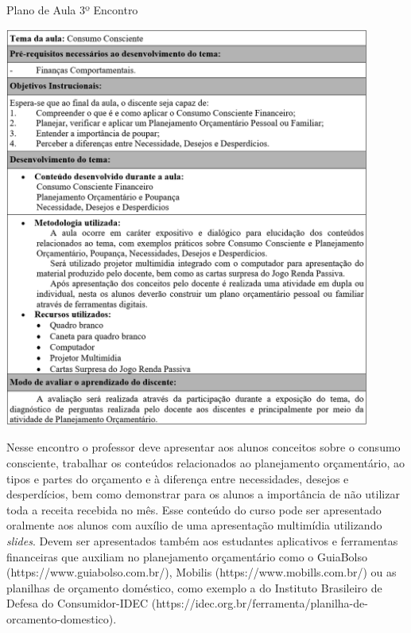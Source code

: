\graphicspath{{quadros/}} 
\begin{quadro}[!ht]
\centering
\begin{minipage}{0.8\textwidth}
\caption{Plano de Aula 3º Encontro}
\centering
\includegraphics[width=0.9\textwidth]{quadro-09-aula 3}
\label{quad: quadro-09-aula 3}
\end{minipage}
\end{quadro}
\newpage
Nesse encontro o professor deve apresentar aos alunos conceitos sobre o consumo consciente, trabalhar os conteúdos relacionados ao planejamento orçamentário, ao tipos e partes do orçamento e à diferença entre necessidades, desejos e desperdícios, bem como demonstrar para os alunos a importância de não utilizar toda a receita recebida no mês. Esse conteúdo do curso pode ser apresentado oralmente aos alunos com auxílio de uma apresentação multimídia utilizando \textit{slides}. Devem ser apresentados também aos estudantes aplicativos e ferramentas financeiras que auxiliam no planejamento orçamentário como o GuiaBolso (https://www.guiabolso.com.br/), Mobilis (https://www.mobills.com.br/) ou as planilhas de orçamento doméstico, como exemplo a do Instituto Brasileiro de Defesa do Consumidor-IDEC (https://idec.org.br/ferramenta/planilha-de-orcamento-domestico).

